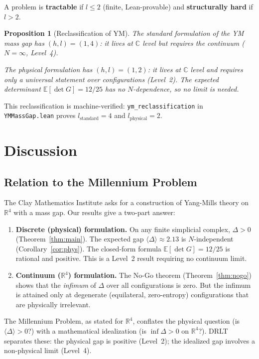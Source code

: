 \documentclass[12pt]{article}
\newtheorem{proposition}[theorem]{Proposition}
\theoremstyle{definition}
\theoremstyle{remark}
\newcommand{\CC}{\mathbb{C}}
\newcommand{\RR}{\mathbb{R}}
\begin{document}
A problem is \textbf{tractable} if $l \le 2$ (finite, Lean-provable)
and \textbf{structurally hard} if $l > 2$.

\begin{proposition}[Reclassification of YM]
The standard formulation of the YM mass gap has
$(h, l) = (1, 4)$: it lives at $\CC$ level but requires the
continuum ($N = \infty$, Level~4).

The physical formulation has $(h, l) = (1, 2)$: it lives at
$\CC$ level and requires only a universal statement over
configurations (Level~2). The expected determinant
$\mathbb{E}[\det G] = 12/25$ has no $N$-dependence, so no
limit is needed.
\end{proposition}

This reclassification is machine-verified:
\texttt{ym\_reclassification} in \texttt{YMMassGap.lean}
proves $l_{\mathrm{standard}} = 4$ and $l_{\mathrm{physical}} = 2$.

\section{Discussion}

\subsection{Relation to the Millennium Problem}

The Clay Mathematics Institute asks for a construction
of Yang-Mills theory on $\RR^4$ with a mass gap.
Our results give a two-part answer:

\begin{enumerate}
\item \textbf{Discrete (physical) formulation.}
  On any finite simplicial complex, $\Delta > 0$
  (Theorem~\ref{thm:main}). The expected gap
  $\langle\Delta\rangle \approx 2.13$ is $N$-independent
  (Corollary~\ref{cor:phys}). The closed-form formula
  $\mathbb{E}[\det G] = 12/25$ is rational and positive.
  This is a Level~2 result requiring no continuum limit.

\item \textbf{Continuum ($\RR^4$) formulation.}
  The No-Go theorem (Theorem~\ref{thm:nogo}) shows that
  the \emph{infimum} of $\Delta$ over all configurations
  is zero. But the infimum is attained only at degenerate
  (equilateral, zero-entropy) configurations that are
  physically irrelevant.
\end{enumerate}

The Millennium Problem, as stated for $\RR^4$, conflates
the physical question (is $\langle\Delta\rangle > 0$?)
with a mathematical idealization (is $\inf\Delta > 0$
on $\RR^4$?). DRLT separates these: the physical gap is
positive (Level~2); the idealized gap involves a
non-physical limit (Level~4).
\end{document}
